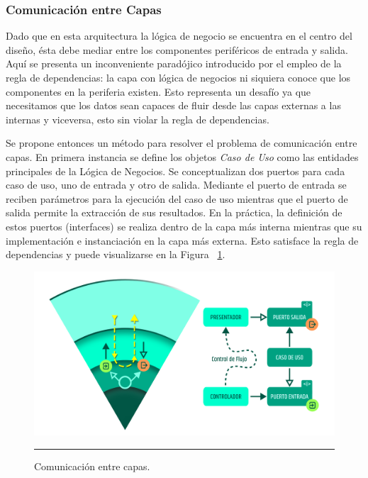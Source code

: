 \subsubsection{Comunicación entre Capas}
Dado que en esta arquitectura la lógica de negocio se encuentra en el centro del diseño, ésta debe mediar entre los componentes periféricos de entrada y salida.
Aquí se presenta un inconveniente paradójico introducido por el empleo de la regla de dependencias: la capa con lógica de negocios ni siquiera conoce que los componentes en la periferia existen.
Esto representa un desafío ya que necesitamos que los datos sean capaces de fluir desde las capas externas a las internas y viceversa, esto sin violar la regla de dependencias.


Se propone entonces un método para resolver el problema de comunicación entre capas.
En primera instancia se define los objetos \emph{Caso de Uso} como las entidades principales de la Lógica de Negocios.
Se conceptualizan dos puertos para cada caso de uso, uno de entrada y otro de salida.
Mediante el puerto de entrada se reciben parámetros para la ejecución del caso de uso mientras que el puerto de salida permite la extracción de sus resultados.
En la práctica, la definición de estos puertos (interfaces) se realiza dentro de la capa más interna mientras que su implementación e instanciación en la capa más externa. Esto satisface la regla de dependencias y puede visualizarse en la Figura ~\ref{fig:C2_CC_01}.


\begin{figure}[htbp]
	\centering
	\includegraphics[width=1\textwidth]{Figures/arch_comunicacion_capas.png}
	\rule{35em}{1pt}
	\caption[Layer Communication]{Comunicación entre capas.}
	\label{fig:C2_CC_01}
\end{figure}


